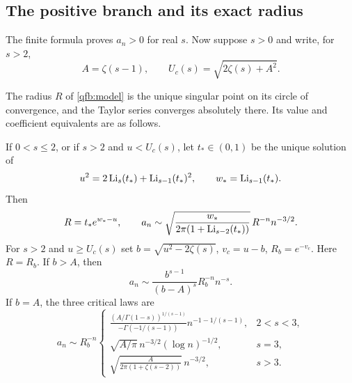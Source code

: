 \subsection{The positive branch and its exact radius}
The finite formula proves $a_n>0$ for real $s$. Now suppose $s>0$
and write, for $s>2$,
\[
 A=\zeta(s-1),\qquad U_c(s)=\sqrt{2\zeta(s)+A^2}.
\]
\begin{theorem}
\label{qfb:phase}
The radius $R$ of \eqref{qfb:model} is the unique singular point on its
circle of convergence, and the Taylor series converges absolutely there.
Its value and coefficient equivalents are as follows.

If $0<s\le2$, or if $s>2$ and $u<U_c(s)$, let $t_*\in(0,1)$ be
the unique solution of
\[
 u^2=2\operatorname{Li}_s(t_*)+\operatorname{Li}_{s-1}(t_*)^2,\qquad w_*=\operatorname{Li}_{s-1}(t_*).
\]
Then
\begin{equation}\label{qfb:interior}
 R=t_*e^{w_*-u},\qquad
 a_n\sim\sqrt{\frac{w_*}{2\pi(1+\operatorname{Li}_{s-2}(t_*))}}\,
                  R^{-n}n^{-3/2}.
\end{equation}
For $s>2$ and $u\ge U_c(s)$ set
$b=\sqrt{u^2-2\zeta(s)}$, $v_c=u-b$, $R_b=e^{-v_c}$.
Here $R=R_b$. If $b>A$, then
\begin{equation}\label{qfb:supercritical}
 a_n\sim\frac{b^{s-1}}{(b-A)^s}R_b^{-n}n^{-s}.
\end{equation}
If $b=A$, the three critical laws are
\begin{equation}\label{qfb:critical}
 a_n\sim R_b^{-n}
 \begin{cases}
 \displaystyle
 \frac{(A/\Gamma(1-s))^{1/(s-1)}}{-\Gamma(-1/(s-1))}
                 n^{-1-1/(s-1)},&2<s<3,\\[6pt]
 \displaystyle \sqrt{A/\pi}\,n^{-3/2}(\log n)^{-1/2},&s=3,\\[4pt]
 \displaystyle \sqrt{\frac{A}{2\pi(1+\zeta(s-2))}}\,n^{-3/2},&s>3.
 \end{cases}
\end{equation}
\end{theorem}
